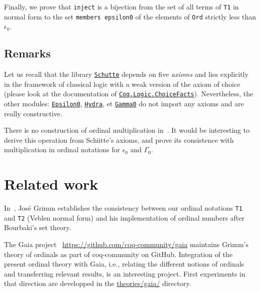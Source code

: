 {%

Finally, we prove that \texttt{inject} is a bijection from the set of all terms of \texttt{T1} in normal form to the set 
\texttt{members epsilon0} of the elements of \texttt{Ord} strictly less than  $\epsilon_0$.






\subsection{Remarks}
Let us recall that the library \href{../theories/html/hydras.Schutte.Schutte.html}%
{\texttt{Schutte}} depends on five \emph{axioms} and lies explicitly in the  
framework of classical logic with a weak version of the axiom of choice
(please look at the documentation of
\href{https://coq.inria.fr/distrib/current/stdlib/Coq.Logic.ChoiceFacts.html}{\texttt{Coq.Logic.ChoiceFacts}}).
Nevertheless, the other modules:
\href{../theories/html/hydras.Epsilon0.Epsilon0.html}%
{\texttt{Epsilon0}},
\href{../theories/html/hydras.Hydra.Hydra.html}%
{\texttt{Hydra}}, et 
\href{../theories/html/hydras.Gamma0.Gamma0.html}%
{\texttt{Gamma0}}
do not import any axioms and are really constructive.

\begin{project}
There is no construction of ordinal multiplication in~\cite{schutte}. 
It would be interesting to derive this operation from Schütte's axioms,
and prove its consistence with multiplication in ordinal notations for 
$\epsilon_0$ and $\Gamma_0$.
\end{project}

\section{Related work}

In~\cite{grimm:hal-00911710}, José Grimm establishes the consistency between our ordinal notations \texttt{T1} and \texttt{T2} (Veblen normal form) and his implementation
of ordinal numbers after Bourbaki's set theory.

The Gaia project ~\url{https://github.com/coq-community/gaia} maintains Grimm's  theory of ordinals as part of coq-community on GitHub. Integration
of the present ordinal theory with Gaia, i.e., relating the different notions of ordinals
and transferring relevant results, is an interesting project.
First experiments in that direction are developped in
the \href{https://github.com/coq-community/hydra-battles/blob/master/theories/gaia/}{theories/gaia/} directory.




}
